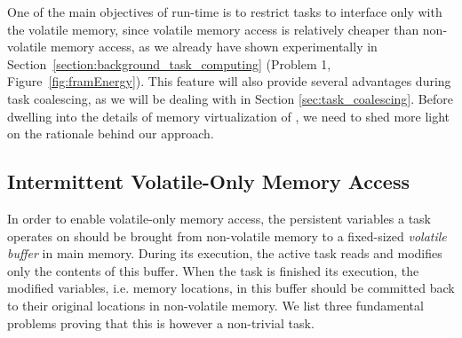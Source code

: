 One of the main objectives of \sys run-time is to restrict tasks to interface only with the volatile memory, since volatile memory access is relatively cheaper than non-volatile memory access, as we already have shown experimentally in Section~\ref{section:background_task_computing} (Problem 1, Figure~\ref{fig:framEnergy}). This feature will also provide several advantages during task coalescing, as we will be dealing with in Section \ref{sec:task_coalescing}. Before dwelling into the details of memory virtualization of \sys, we need to shed more light on the rationale behind our approach.

\subsection{Intermittent Volatile-Only Memory Access}
\label{sec:virtualization_problems}

In order to enable volatile-only memory access, the persistent variables a task operates on should be brought from non-volatile memory to a fixed-sized \emph{volatile buffer} in main memory. During its execution, the active task reads and modifies only the contents of this buffer. When the task is finished its execution, the modified variables, i.e. memory locations, in this buffer should be committed back to their original locations in non-volatile memory. We list three fundamental problems proving that this is however a non-trivial task. 




